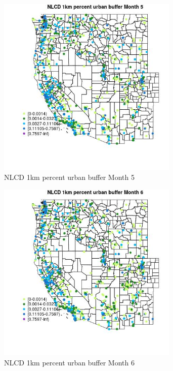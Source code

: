 \begin{figure} 
\centering  
\includegraphics[width=0.77\textwidth]{Code_Outputs/Report_ML_input_PM25_Step4_part_e_de_duplicated_aves_compiled_2019-05-21wNAs_MapObsMo5NLCD_1km_percent_urban_buffer.jpg} 
\caption{\label{fig:Report_ML_input_PM25_Step4_part_e_de_duplicated_aves_compiled_2019-05-21wNAsMapObsMo5NLCD_1km_percent_urban_buffer}NLCD 1km percent urban buffer Month 5} 
\end{figure} 
 

\clearpage 

\begin{figure} 
\centering  
\includegraphics[width=0.77\textwidth]{Code_Outputs/Report_ML_input_PM25_Step4_part_e_de_duplicated_aves_compiled_2019-05-21wNAs_MapObsMo6NLCD_1km_percent_urban_buffer.jpg} 
\caption{\label{fig:Report_ML_input_PM25_Step4_part_e_de_duplicated_aves_compiled_2019-05-21wNAsMapObsMo6NLCD_1km_percent_urban_buffer}NLCD 1km percent urban buffer Month 6} 
\end{figure} 
 

